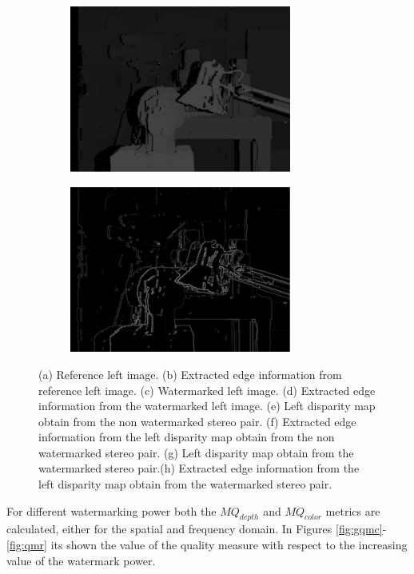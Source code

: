 \begin{figure}[h!]
\begin{subfigure}[]{0.4\textwidth}
\caption{\label{fig:lds}}
\end{subfigure}
\begin{subfigure}[]{0.4\textwidth}
\centering
\includegraphics[width=0.8\textwidth]{./img/rdisp.jpg}
\caption{\label{fig:rd}}
\end{subfigure}
\begin{subfigure}[]{0.4\textwidth}
\centering
\includegraphics[width=0.8\textwidth]{./img/rdisp_sobel.jpg}
\caption{\label{rds}}
\end{subfigure}
\caption{\small{(a) Reference left image. (b) Extracted edge information from reference left image. (c) Watermarked left image. (d) Extracted edge information from the watermarked left image. (e) Left disparity map obtain from the non watermarked stereo pair. (f) Extracted edge information from the left disparity map obtain from the non watermarked stereo pair. (g)  Left disparity map obtain from the watermarked stereo pair.(h) Extracted edge information from the left disparity map obtain from the watermarked stereo pair. }\label{fig:sobel}}
\end{figure}
\clearpage
For different watermarking power both the $MQ_{depth}$ and $MQ_{color}$ metrics are calculated, either for the spatial and frequency domain. In Figures \ref{fig:gqmc}-\ref{fig:qmr} its shown the value of the quality measure with respect to the increasing value of the watermark power. 

